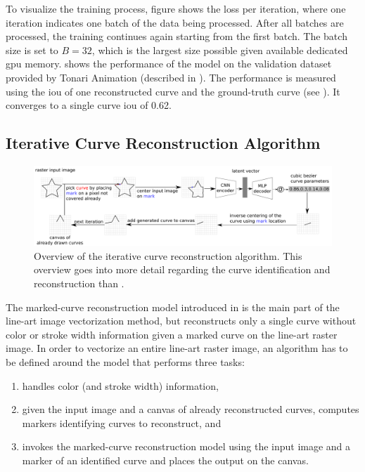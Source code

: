 To visualize the training process, figure  shows the loss per iteration, where one iteration indicates one batch of the data being processed. After all batches are processed, the training continues again starting from the first batch. The batch size is set to $B=32$, which is the largest size possible given available dedicated \gls{gpu} memory.  shows the performance of the model on the validation dataset provided by Tonari Animation (described in ). The performance is measured using the \gls{iou} of one reconstructed curve and the ground-truth curve (see ). It converges to a single curve \gls{iou} of 0.62.

\subsection{Iterative Curve Reconstruction Algorithm}
\label{subsec:model.infer}

\begin{figure}
    \centering
    \includegraphics[width=\textwidth]{graphics/icra.pdf}
    \caption{Overview of the iterative curve reconstruction algorithm. This overview goes into more detail regarding the curve identification and reconstruction than .}
    \label{fig:icra}
\end{figure}

The marked-curve reconstruction model introduced in  is the main part of the line-art image vectorization method, but reconstructs only a single curve without color or stroke width information given a marked curve on the line-art raster image. In order to vectorize an entire line-art raster image, an algorithm has to be defined around the model that performs three tasks: 

\begin{enumerate}
    \item handles color (and stroke width) information,
    \item given the input image and a canvas of already reconstructed curves, computes markers identifying curves to reconstruct, and
    \item invokes the marked-curve reconstruction model using the input image and a marker of an identified curve and places the output on the canvas.
\end{enumerate}

